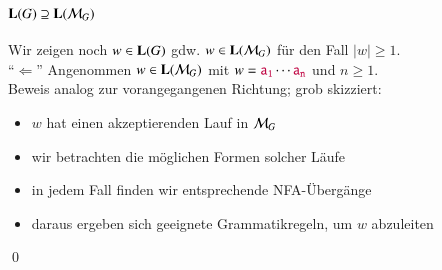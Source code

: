 \documentclass[aspectratio=1610,onlymath]{beamer}
\begin{document}
\begin{frame}[t]\frametitle{$\textbf{\textcolor{black}{L}}(G)\supseteq\textbf{\textcolor{black}{L}}(\mathcal{M}_G)$}

Wir zeigen noch $w\in\textbf{\textcolor{black}{L}}(G)$ gdw. $w\in\textbf{\textcolor{black}{L}}(\mathcal{M}_G)$ für den Fall $|w|\geq 1$.\\[1ex]

"`$\Leftarrow$"' Angenommen $w\in\textbf{\textcolor{black}{L}}(\mathcal{M}_G)$ mit $w=\mathtt{\textcolor{purple}{a_1}}\cdots\mathtt{\textcolor{purple}{a_n}}$ und $n\geq 1$.\pause\\[2ex]

Beweis analog zur vorangegangenen Richtung; grob skizziert:
\begin{itemize}
\item $w$ hat einen akzeptierenden Lauf in $\mathcal{M}_G$
\item wir betrachten die möglichen Formen solcher Läufe
\item in jedem Fall finden wir entsprechende NFA-Übergänge
\item daraus ergeben sich geeignete Grammatikregeln, um $w$ abzuleiten
\end{itemize}

\qed

\end{frame}
\end{document}
